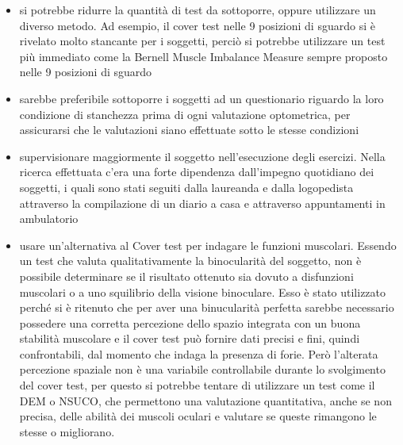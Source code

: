 \begin{itemize}
\item si potrebbe ridurre la quantità di test da sottoporre, oppure utilizzare un diverso metodo. Ad esempio, il cover test nelle 9 posizioni di sguardo si è rivelato molto stancante per i soggetti, perciò si potrebbe utilizzare un test più immediato come la Bernell Muscle Imbalance Measure sempre proposto nelle 9 posizioni di sguardo
\item sarebbe preferibile sottoporre i soggetti ad un questionario riguardo la loro condizione di stanchezza prima di ogni valutazione optometrica, per assicurarsi che le valutazioni siano effettuate sotto le stesse condizioni
\item supervisionare maggiormente il soggetto nell’esecuzione degli esercizi. Nella ricerca effettuata c’era una forte dipendenza dall’impegno quotidiano dei soggetti, i quali sono stati seguiti dalla laureanda e dalla logopedista attraverso la compilazione di un diario a casa e attraverso appuntamenti in ambulatorio
\item usare un’alternativa al Cover test per indagare le funzioni muscolari. Essendo un test che valuta qualitativamente la binocularità del soggetto, non è possibile determinare se il risultato ottenuto sia dovuto a disfunzioni muscolari o a uno squilibrio della visione binoculare. Esso è stato utilizzato perché si è ritenuto che per aver una binucularità perfetta sarebbe necessario possedere una corretta percezione dello spazio integrata con un buona stabilità muscolare e il cover test può fornire dati precisi e fini, quindi confrontabili, dal momento che indaga la presenza di forie\cite{bib11}. Però l’alterata percezione spaziale non è una variabile controllabile durante lo svolgimento del cover test, per questo si potrebbe tentare di utilizzare un test come il DEM o NSUCO, che permettono una valutazione quantitativa, anche se non precisa, delle abilità dei muscoli oculari e valutare se queste rimangono le stesse o migliorano.
\end{itemize}
